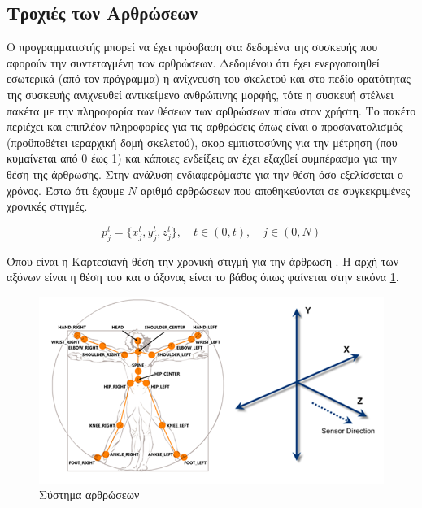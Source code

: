 \subsection{Τροχιές των Αρθρώσεων}

Ο προγραμματιστής  μπορεί να έχει πρόσβαση στα δεδομένα της συσκευής που αφορούν την συντεταγμένη των αρθρώσεων. Δεδομένου ότι έχει ενεργοποιηθεί εσωτερικά (από τον πρόγραμμα) η ανίχνευση του σκελετού και στο πεδίο ορατότητας της συσκευής ανιχνευθεί αντικείμενο ανθρώπινης μορφής, τότε η συσκευή στέλνει πακέτα με την πληροφορία των θέσεων των αρθρώσεων πίσω στον χρήστη. Το πακέτο περιέχει και επιπλέον πληροφορίες για τις αρθρώσεις όπως είναι ο προσανατολισμός (προϋποθέτει ιεραρχική δομή σκελετού), σκορ εμπιστοσύνης για την μέτρηση (που κυμαίνεται από 0 έως 1) και κάποιες ενδείξεις αν έχει εξαχθεί συμπέρασμα για την θέση της άρθρωσης. Στην ανάλυση ενδιαφερόμαστε για την θέση όσο εξελίσσεται ο χρόνος. Έστω ότι έχουμε $Ν$ αριθμό αρθρώσεων που αποθηκεύονται σε συγκεκριμένες χρονικές στιγμές.

\begin{equation}
    p^{t}_{j} = \{x^{t}_{j}, y^{t}_{j}, z^{t}_{j}\}, \quad t \in (0, t), \quad j \in (0, N)
    \label{equ:trajectories}
\end{equation}

Όπου  είναι η Καρτεσιανή θέση την χρονική στιγμή  για την άρθρωση . Η αρχή των αξόνων είναι η θέση του  και ο άξονας  είναι το βάθος όπως φαίνεται στην εικόνα \ref{fig:kinect-joints}.

\begin{figure}[H]
    \centering
    \includegraphics[width=.8\textwidth]{kinect/fig/kinect-joints.png}
    \caption{Σύστημα αρθρώσεων\protect\footnotemark}
    \label{fig:kinect-joints}
\end{figure}

